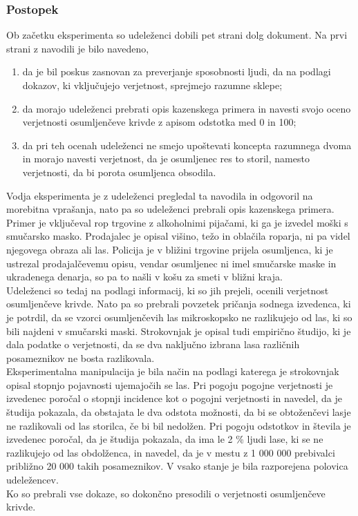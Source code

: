 \documentclass[12pt,a4paper]{amsart}
\theoremstyle{definition} %
\theoremstyle{plain} %
\begin{document}
\subsubsection{Postopek}
Ob začetku eksperimenta so udeleženci dobili pet strani dolg dokument. Na prvi strani z navodili je bilo navedeno,
\begin{enumerate}
   \item da je bil poskus zasnovan za preverjanje sposobnosti ljudi, da na podlagi dokazov, ki vključujejo verjetnost, sprejmejo razumne sklepe;
   \item da morajo udeleženci prebrati opis kazenskega primera in navesti svojo oceno verjetnosti osumljenčeve krivde z apisom odstotka med 0 in 100;
   \item da pri teh ocenah udeleženci ne smejo upoštevati koncepta razumnega dvoma in morajo navesti verjetnost, da je osumljenec res to storil, 
   namesto verjetnosti, da bi porota osumljenca obsodila.
\end{enumerate}
Vodja eksperimenta je z udeleženci pregledal ta navodila in odgovoril na morebitna vprašanja, nato pa so udeleženci prebrali opis kazenskega primera.\\
Primer je vključeval rop trgovine z alkoholnimi pijačami, ki ga je izvedel moški s smučarsko masko. Prodajalec je opisal višino, težo in oblačila roparja, 
ni pa videl njegovega obraza ali las. Policija je v bližini trgovine prijela osumljenca, ki je ustrezal prodajalčevemu opisu, vendar osumljenec ni imel 
smučarske maske in ukradenega denarja, so pa to našli v košu za smeti v bližni kraja. \\
Udeleženci so tedaj na podlagi informacij, ki so jih prejeli, ocenili verjetnost osumljenčeve krivde. Nato pa so prebrali povzetek pričanja sodnega izvedenca, 
ki je potrdil, da se vzorci osumljenčevih las mikroskopsko ne razlikujejo od las, ki so bili najdeni v smučarski maski. Strokovnjak je opisal tudi empirično 
študijo, ki je dala podatke o verjetnosti, da se dva naključno izbrana lasa različnih posameznikov ne bosta razlikovala. \\
Eksperimentalna manipulacija je bila način na podlagi katerega je strokovnjak opisal stopnjo pojavnosti ujemajočih se las. Pri pogoju pogojne verjetnosti je 
izvedenec poročal o stopnji incidence kot o pogojni verjetnosti in navedel, da je študija pokazala, da obstajata le dva odstota možnosti, da bi se obtoženčevi 
lasje ne razlikovali od las storilca, če bi bil nedolžen. Pri pogoju odstotkov in števila je izvedenec poročal, da je študija pokazala, da ima le 2 \% ljudi 
lase, ki se ne razlikujejo od las obdolženca, in navedel, da je v mestu z 1 000 000 prebivalci približno 20 000 takih posameznikov. V vsako stanje je bila 
razporejena polovica udeležencev. \\
Ko so prebrali vse dokaze, so dokončno presodili o verjetnosti osumljenčeve krivde.
\end{document}
